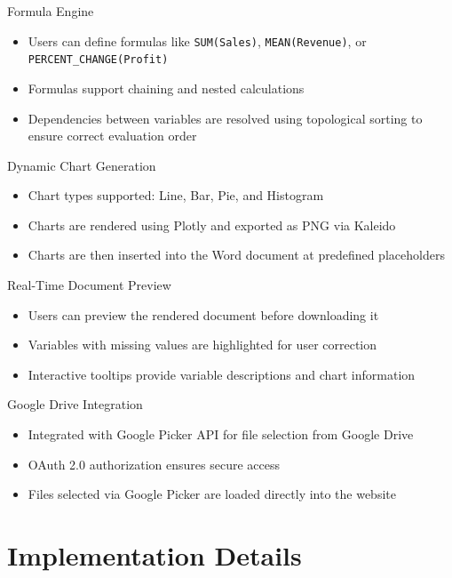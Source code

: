 \documentclass[handout, 12pt]{beamer}
\begin{document}
	\begin{frame}{Formula Engine}
		\begin{itemize}
		  \item Users can define formulas like \texttt{SUM(Sales)}, \texttt{MEAN(Revenue)}, or \texttt{PERCENT\_CHANGE(Profit)}
		  \item Formulas support chaining and nested calculations
		  \item Dependencies between variables are resolved using topological sorting to ensure correct evaluation order
		\end{itemize}
	\end{frame}

	\begin{frame}{Dynamic Chart Generation}
		\begin{itemize}
		  \item Chart types supported: Line, Bar, Pie, and Histogram
		  \item Charts are rendered using Plotly and exported as PNG via Kaleido
		  \item Charts are then inserted into the Word document at predefined placeholders
		\end{itemize}
	\end{frame}

	\begin{frame}{Real-Time Document Preview}
		\begin{itemize}
		  \item Users can preview the rendered document before downloading it
		  \item Variables with missing values are highlighted for user correction
		  \item Interactive tooltips provide variable descriptions and chart information
		\end{itemize}
	\end{frame}

	\begin{frame}{Google Drive Integration}
		\begin{itemize}
		  \item Integrated with Google Picker API for file selection from Google Drive
		  \item OAuth 2.0 authorization ensures secure access
		  \item Files selected via Google Picker are loaded directly into the website
		\end{itemize}
	\end{frame}

	\section{Implementation Details}
\end{document}
